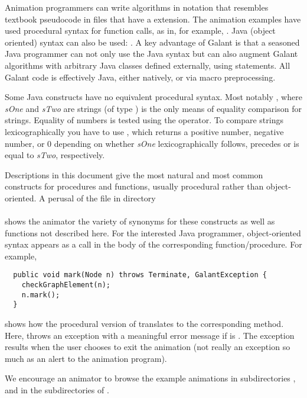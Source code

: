 Animation programmers can write algorithms in notation that resembles
textbook pseudocode
in files that have a  extension.
The animation examples have used procedural syntax for function calls, as in, for example,
.
Java (object oriented) syntax can also be used: .
A key advantage of Galant is that a seasoned Java programmer can
not only use the Java syntax but can also augment Galant algorithms with
arbitrary Java classes defined externally, using  statements.
All Galant code is effectively Java, either natively, or via macro
preprocessing.

Some Java constructs have no equivalent procedural syntax. Most notably
, where \emph{sOne} and
\emph{sTwo} are strings (of type ) is the only means of
equality comparison for strings. Equality of numbers is tested using the
\Code{==} operator.
To compare strings lexicographically you have to use
, which returns a positive
number, negative number, or 0 depending on whether \emph{sOne}
lexicographically follows,
precedes or is equal to \emph{sTwo}, respectively.

Descriptions in this document give the most natural and most common
constructs for procedures and functions, usually procedural rather
than object-oriented.
A perusal of the file  in directory\\ 
\hspace*{1em}\\
shows the animator the variety of
synonyms for these constructs
as well as functions not described here. For the interested Java programmer,
object-oriented syntax appears as a call in the body of the corresponding
function/procedure. For example,
\begin{verbatim}
  public void mark(Node n) throws Terminate, GalantException {
    checkGraphElement(n);
    n.mark();
  }
\end{verbatim}
shows how the procedural version of  translates to the
corresponding  method. Here,  throws an
exception with a meaningful error message if  is .
The  exception results when the user chooses to exit the
animation (not really an exception so much as an alert to the animation
program).

We encourage an animator to browse the example animations in subdirectories
,  and in the subdirectories of .

